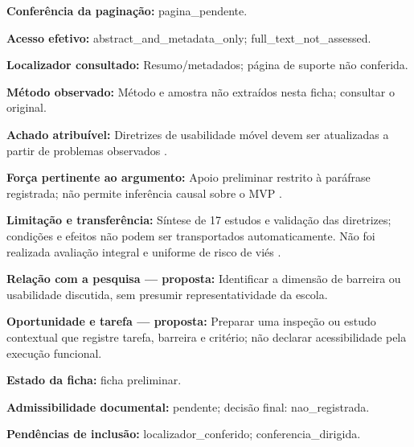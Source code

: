 \noindent\textbf{Conferência da paginação:} pagina\_pendente.\par\medskip

\noindent\textbf{Acesso efetivo:} abstract\_and\_metadata\_only; full\_text\_not\_assessed.\par\medskip

\noindent\textbf{Localizador consultado:} Resumo/metadados; página de suporte não conferida.\par\medskip

\noindent\textbf{Método observado:} Método e amostra não extraídos nesta ficha; consultar o original.\par\medskip

\noindent\textbf{Achado atribuível:} Diretrizes de usabilidade móvel devem ser atualizadas a partir de problemas observados \citep{kumarguideline2019}.\par\medskip

\noindent\textbf{Força pertinente ao argumento:} Apoio preliminar restrito à paráfrase registrada; não permite inferência causal sobre o MVP \citep{kumarguideline2019}.\par\medskip

\noindent\textbf{Limitação e transferência:} Síntese de 17 estudos e validação das diretrizes; condições e efeitos não podem ser transportados automaticamente. Não foi realizada avaliação integral e uniforme de risco de viés \citep{kumarguideline2019}.\par\medskip

\noindent\textbf{Relação com a pesquisa — proposta:} Identificar a dimensão de barreira ou usabilidade discutida, sem presumir representatividade da escola.\par\medskip

\noindent\textbf{Oportunidade e tarefa — proposta:} Preparar uma inspeção ou estudo contextual que registre tarefa, barreira e critério; não declarar acessibilidade pela execução funcional.\par\medskip

\noindent\textbf{Estado da ficha:} ficha preliminar.\par\medskip

\noindent\textbf{Admissibilidade documental:} pendente; decisão final: nao\_registrada.\par\medskip

\noindent\textbf{Pendências de inclusão:} localizador\_conferido; conferencia\_dirigida.\par\medskip

